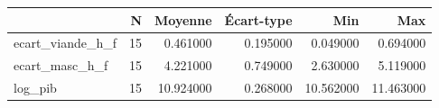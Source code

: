 \begin{tabular}{lrrrrr}
\toprule
 & N & Moyenne & Écart-type & Min & Max \\
\midrule
ecart_viande_h_f & 15 & 0.461000 & 0.195000 & 0.049000 & 0.694000 \\
ecart_masc_h_f & 15 & 4.221000 & 0.749000 & 2.630000 & 5.119000 \\
log_pib & 15 & 10.924000 & 0.268000 & 10.562000 & 11.463000 \\
\bottomrule
\end{tabular}
